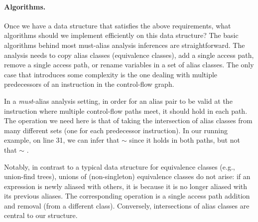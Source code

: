 \paragraph{Algorithms.} Once we have a data structure that satisfies the above
requirements, what algorithms should we implement efficiently on this data
structure? The basic algorithms behind most must-alias analysis inferences are
straightforward. The analysis needs to copy alias classes (equivalence classes),
add a single access path, remove a single access path, or rename variables in a set
of alias classes. The only case that introduces some complexity is the one
dealing with multiple predecessors of an instruction in the control-flow graph.

In a \emph{must}-alias analysis setting, in order for an alias pair to be valid
at the instruction where multiple control-flow paths meet, it should hold in
each path. The operation we need here is that of taking the intersection of
alias classes from many different sets (one for each predecessor instruction).
In our running example, on line 31, we can infer that  $\sim$
 since it holds in both paths, but not that  $\sim$ .

Notably, in contrast to a typical data structure for equivalence
classes (e.g., union-find trees), unions of (non-singleton)
equivalence classes do not arise: if an expression is newly aliased
with others, it is because it is no longer aliased with its previous
aliases. The corresponding operation is a single access path addition
and removal (from a different class). Conversely, intersections of
alias classes are central to our structure.



